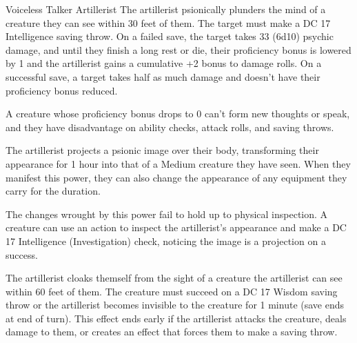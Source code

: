 \documentclass[10pt,a4paper,twoside,bg=print,twocolumn,openany,nodeprecatedcode]{dndbook}
\begin{document}
\begin{DndMonster}[float=t]{Voiceless Talker Artillerist}
The artillerist psionically plunders the mind of a creature they can see within 30 feet of them. The target must make a DC 17 Intelligence saving throw. On a failed save, the target takes 33 (6d10) psychic damage, and until they finish a long rest or die, their proficiency bonus is lowered by 1 and the artillerist gains a cumulative +2 bonus to damage rolls. On a successful save, a target takes half as much damage and doesn't have their proficiency bonus reduced.

A creature whose proficiency bonus drops to 0 can't form new thoughts or speak, and they have disadvantage on ability checks, attack rolls, and saving throws.

The artillerist projects a psionic image over their body, transforming their appearance for 1 hour into that of a Medium creature they have seen. When they manifest this power, they can also change the appearance of any equipment they carry for the duration.

The changes wrought by this power fail to hold up to physical inspection. A creature can use an action to inspect the artillerist's appearance and make a DC 17 Intelligence (Investigation) check, noticing the image is a projection on a success.

The artillerist cloaks themself from the sight of a creature the artillerist can see within 60 feet of them. The creature must succeed on a DC 17 Wisdom saving throw or the artillerist becomes invisible to the creature for 1 minute (save ends at end of turn). This effect ends early if the artillerist attacks the creature, deals damage to them, or creates an effect that forces them to make a saving throw.

\end{DndMonster}
\end{document}
